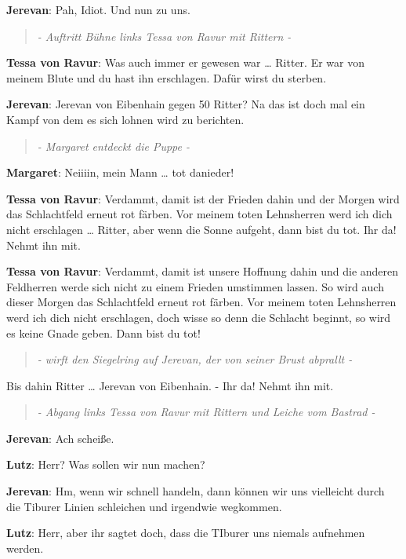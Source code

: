 \documentclass[a5paper,6pt]{book}
\begin{document}
\textbf{Jerevan}: Pah, Idiot. Und nun zu uns.

\begin{quote}
  \textit{- Auftritt Bühne links Tessa von Ravur mit Rittern -
}
 \end{quote}

\textbf{Tessa von Ravur}: Was auch immer er gewesen war … Ritter. Er war von meinem Blute und du hast ihn erschlagen. Dafür wirst du sterben.

\textbf{Jerevan}: Jerevan von Eibenhain gegen 50 Ritter? Na das ist doch mal ein Kampf von dem es sich lohnen wird zu berichten.

\begin{quote}
  \textit{- Margaret entdeckt die Puppe -
}
 \end{quote}

\textbf{Margaret}: Neiiiin, mein Mann … tot danieder!

\textbf{Tessa von Ravur}: Verdammt, damit ist der Frieden dahin und der Morgen wird das Schlachtfeld erneut rot färben.
Vor meinem toten Lehnsherren werd ich dich nicht erschlagen … Ritter, aber wenn die Sonne aufgeht, dann bist du tot. Ihr da! Nehmt ihn mit.

\textbf{Tessa von Ravur}: Verdammt, damit ist unsere Hoffnung dahin und die anderen Feldherren werde sich nicht zu einem Frieden umstimmen lassen. So wird auch dieser Morgen das Schlachtfeld erneut rot färben. Vor meinem toten Lehnsherren werd ich dich nicht erschlagen, doch wisse so denn die Schlacht beginnt, so wird es keine Gnade geben. Dann bist du tot!

\begin{quote}
  \textit{- wirft den Siegelring auf Jerevan, der von seiner Brust abprallt -
}
 \end{quote}

Bis dahin Ritter … Jerevan von Eibenhain. - Ihr da! Nehmt ihn mit.

\begin{quote}
  \textit{- Abgang links Tessa von Ravur mit Rittern und Leiche vom Bastrad -
}
 \end{quote}


\textbf{Jerevan}: Ach scheiße.

\textbf{Lutz}: Herr? Was sollen wir nun machen?

\textbf{Jerevan}: Hm, wenn wir schnell handeln, dann können wir uns vielleicht durch die Tiburer Linien schleichen und irgendwie wegkommen.

\textbf{Lutz}: Herr, aber ihr sagtet doch, dass die TIburer uns niemals aufnehmen werden.
\end{document}
